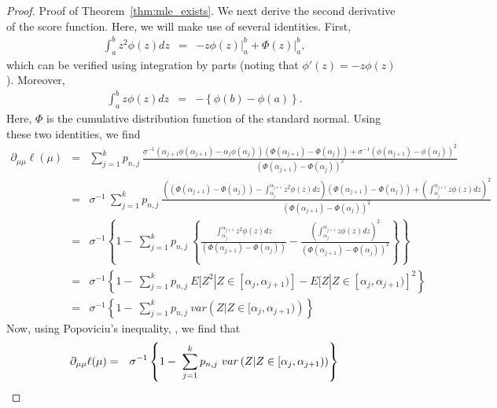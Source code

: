 \documentclass[12pt]{article} %
\begin{document}
\begin{proof}{Proof of Theorem~\ref{thm:mle_exists}.}
We next derive the second derivative of the score function.    Here, we will make use of several identities.   First,
\begin{eqnarray*}
\int_a^b z^2 \phi(z)dz &=& -z\phi(z) \vert_a^b + \Phi(z) \vert_a^b,
\end{eqnarray*}
which can be verified using integration by parts (noting that $\phi'(z)=-z\phi(z)$).  %
Moreover, 
\begin{eqnarray}\label{line:Gauss_ID1}
\int_{a}^{b}z\phi(z)dz &=& - \left\{ \phi(b)-\phi(a)\right\}.
\end{eqnarray}
Here, $\Phi$ is the cumulative distribution function of the standard normal.  Using these two identities, we find 
\begin{eqnarray*}
\partial_{\mu \mu} \ell(\mu) &=& \sum_{j=1}^k p_{n,j} \ \frac{\sigma^{-1}\left(\alpha_{j+1}\phi(\alpha_{j+1})-\alpha_{j}\phi(\alpha_{j})\right)\left(\Phi(\alpha_{j+1})-\Phi(\alpha_{j})\right)+\sigma^{-1}\left(\phi(\alpha_{j+1})-\phi(\alpha_{j})\right)^2}{\left(\Phi(\alpha_{j+1})-\Phi(\alpha_{j})\right)^2}\\
&=&\sigma^{-1} \ \sum_{j=1}^k p_{n,j} \ \frac{\left(\left(\Phi(\alpha_{j+1})-\Phi(\alpha_{j})\right)-\int_{\alpha_{j}}^{\alpha_{j+1}} z^2\phi(z) dz\right)\left(\Phi(\alpha_{j+1})-\Phi(\alpha_{j})\right)+\left(\int_{\alpha_{j}}^{\alpha_{j+1}} z\phi(z) dz\right)^2}{\left(\Phi(\alpha_{j+1})-\Phi(\alpha_{j})\right)^2}\\
&=&\sigma^{-1} \left\{1- \ \sum_{j=1}^k p_{n,j} \ \left\{\frac{\int_{\alpha_{j}}^{\alpha_{j+1}} z^2\phi(z) dz}{\left(\Phi(\alpha_{j+1})-\Phi(\alpha_{j})\right)}-\frac{\left(\int_{\alpha_{j}}^{\alpha_{j+1}} z\phi(z) dz\right)^2}{\left(\Phi(\alpha_{j+1})-\Phi(\alpha_{j})\right)^2}\right\}\right\}\\
&=& \sigma^{-1} \left\{1- \ \sum_{j=1}^k p_{n,j} \ E[Z^2|Z \in [\alpha_{j},\alpha_{j+1})]-E[Z|Z \in [\alpha_{j},\alpha_{j+1})]^2\right\}\\
&=& \sigma^{-1} \left\{1- \ \sum_{j=1}^k p_{n,j} \ var\left(Z\vert Z \in [\alpha_{j},\alpha_{j+1})\right)\right\}
\end{eqnarray*}
Now, using Popoviciu's inequality, \citep{poppy}, we find that 
\begin{eqnarray}\label{line:pop}
\partial_{\mu \mu} \ell(\mu) &= &\sigma^{-1} \left\{1- \ \sum_{j=1}^k p_{n,j} \ var\left(Z\vert Z \in [\alpha_{j},\alpha_{j+1})\right)\right\}\notag\\

\end{eqnarray}
\end{proof}
\end{document}

